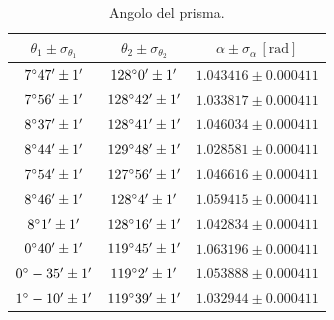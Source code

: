 \documentclass[]{article}
\begin{document}
    \begin{table}[H]
        \centering
        \begin{tabular}{||c|c|c||}
            \hline
            $\theta_1 \pm \sigma_{\theta_1}$ & $\theta_2 \pm \sigma_{\theta_2}$ & $\alpha \pm \sigma_{\alpha} \,\left[\text{rad}\right]$ \\\hline
            \hline
            $7\degree  47' \pm 1'$ & $128\degree  0' \pm 1'$ & $1.043416 \pm 0.000411$ \\\hline
            $7\degree  56' \pm 1'$ & $128\degree 42' \pm 1'$ & $1.033817 \pm 0.000411$ \\\hline
            $8\degree  37' \pm 1'$ & $128\degree 41' \pm 1'$ & $1.046034 \pm 0.000411$ \\\hline
            $8\degree  44' \pm 1'$ & $129\degree 48' \pm 1'$ & $1.028581 \pm 0.000411$ \\\hline
            $7\degree  54' \pm 1'$ & $127\degree 56' \pm 1'$ & $1.046616 \pm 0.000411$ \\\hline
            $8\degree  46' \pm 1'$ & $128\degree  4' \pm 1'$ & $1.059415 \pm 0.000411$ \\\hline
            $8\degree   1' \pm 1'$ & $128\degree 16' \pm 1'$ & $1.042834 \pm 0.000411$ \\\hline
            $0\degree  40' \pm 1'$ & $119\degree 45' \pm 1'$ & $1.063196 \pm 0.000411$ \\\hline
            $0\degree -35' \pm 1'$ & $119\degree  2' \pm 1'$ & $1.053888 \pm 0.000411$ \\\hline
            $1\degree -10' \pm 1'$ & $119\degree 39' \pm 1'$ & $1.032944 \pm 0.000411$ \\\hline
        \end{tabular}
        \caption{Angolo del prisma.}
        \label{theta-1-2-alpha}
    \end{table}
\end{document}
